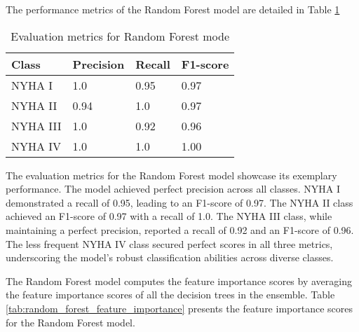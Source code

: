   The performance metrics of the Random Forest model are detailed in Table \ref{tab:metrics random forest}
  \begin{table}[H]
    \centering
    \caption{Evaluation metrics for Random Forest mode}
    \label{tab:metrics random forest}
    \begin{tabular}{|p{2cm}|p{2cm}|p{1.5cm}|p{2cm}|}
    \hline
    \textbf{Class} & \textbf{Precision} & \textbf{Recall} & \textbf{F1-score} \\ \hline
    NYHA I         & 1.0               & 0.95            & 0.97              \\ 
    NYHA II        & 0.94               & 1.0            & 0.97              \\ 
    NYHA III       & 1.0               & 0.92            & 0.96              \\
    NYHA IV        & 1.0                & 1.0             & 1.00              \\ \hline
    \end{tabular}
    \end{table}

    The evaluation metrics for the Random Forest model showcase its exemplary performance. The model achieved perfect precision across all classes. NYHA I demonstrated a recall of 0.95, leading to an F1-score of 0.97. The NYHA II class achieved an F1-score of 0.97 with a recall of 1.0. The NYHA III class, while maintaining a perfect precision, reported a recall of 0.92 and an F1-score of 0.96. The less frequent NYHA IV class secured perfect scores in all three metrics, underscoring the model's robust classification abilities across diverse classes.

    The Random Forest model computes the feature importance scores by averaging the feature importance scores of all the decision trees in the ensemble. Table \ref{tab:random_forest_feature_importance} presents the feature importance scores for the Random Forest model.

